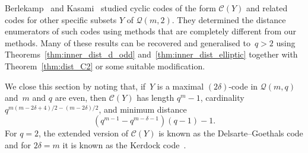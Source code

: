 \documentclass[10pt]{article}
\theoremstyle{definition}
\newcommand{\Q}{\mathscr{Q}}
\newcommand{\Cc}{\mathcal{C}}
\renewcommand{\d}{\delta}
\begin{document}
\par
Berlekamp~\cite{Ber1970} and Kasami~\cite{Kas1971} studied cyclic codes of the form $\Cc(Y)$ and related codes for other specific subsets $Y$ of $\Q(m,2)$. They determined the distance enumerators of such codes using methods that are completely different from our methods. Many of these results can be recovered and generalised to~$q>2$ using Theorems~\ref{thm:inner_dist_d_odd} and~\ref{thm:inner_dist_elliptic} together with Theorem~\ref{thm:dist_C2} or some suitable modification.
\par
We close this section by noting that, if~$Y$ is a maximal $(2\delta)$-code in $\Q(m,q)$ and~$m$ and $q$ are even, then $\Cc(Y)$ has length $q^m-1$, cardinality $q^{m(m-2\d+4)/2-(m-2\d)/2}$, and minimum distance
\[
(q^{m-1}-q^{m-\delta-1})(q-1)-1.
\]
For $q=2$, the extended version of $\Cc(Y)$ is known as the Delsarte--Goethals code and for $2\d=m$ it is known as the Kerdock code~\cite[Ch.~15]{MacSlo1977}.
\end{document}
